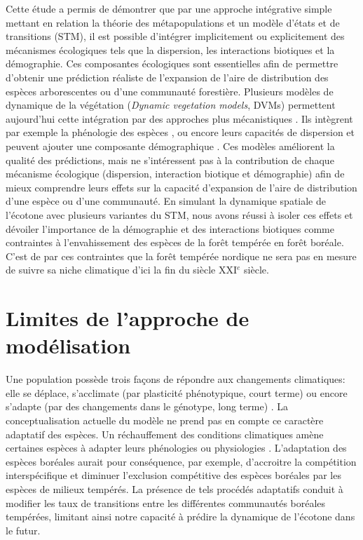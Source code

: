 
Cette étude a permis de démontrer que par une approche intégrative simple mettant en relation la
théorie des métapopulations et un modèle d'états et de transitions (STM), il est possible d'intégrer
implicitement ou explicitement des mécanismes écologiques tels que la dispersion, les interactions
biotiques et la démographie. Ces composantes écologiques sont essentielles afin de permettre
d'obtenir une prédiction réaliste de l'expansion de l'aire de distribution des espèces arborescentes
ou d'une communauté forestière. Plusieurs modèles de dynamique de la végétation (\textit{Dynamic
vegetation models}, DVMs) permettent aujourd'hui cette intégration par des approches plus
mécanistiques \citep{Snell2014a}. Ils intègrent par exemple la phénologie des espèces
\citep{Letters2001,Morin2008}, ou encore leurs capacités de dispersion \citep{Nobis2014,Iverson2004}
et peuvent ajouter une composante démographique \citep{Lischke2006a,Vanderwel2014}. Ces modèles
améliorent la qualité des prédictions, mais ne s'intéressent pas à la contribution de chaque
mécanisme écologique (dispersion, interaction biotique et démographie) afin de mieux comprendre
leurs effets sur la capacité d'expansion de l'aire de distribution d'une espèce ou d'une
communauté. En simulant la dynamique spatiale de l'écotone avec plusieurs variantes du STM, nous
avons réussi à isoler ces effets et dévoiler l'importance de la démographie et des interactions
biotiques comme contraintes à l'envahissement des espèces de la forêt tempérée en forêt boréale.
C'est de par ces contraintes que la forêt tempérée nordique ne sera pas en mesure de suivre sa
niche climatique d'ici la fin du siècle XXI$^e$ siècle.

\section*{Limites de l'approche de modélisation}

Une population possède trois façons de répondre aux  changements climatiques: elle se déplace,
s'acclimate (par plasticité phénotypique, court terme) ou encore s'adapte (par des changements dans
le génotype, long terme) \citep{Corlett2013}. La conceptualisation actuelle du modèle ne prend pas
en compte ce caractère adaptatif des espèces. Un réchauffement des conditions climatiques amène
certaines espèces à adapter leurs phénologies ou physiologies \citep{Saxe2001,Davis2001}.
L'adaptation des espèces boréales aurait pour conséquence, par exemple, d'accroitre la compétition
interspécifique et diminuer l'exclusion compétitive des espèces boréales par les espèces de milieux
tempérés. La présence de tels procédés adaptatifs conduit à modifier les taux de transitions entre
les différentes communautés boréales tempérées, limitant ainsi notre capacité à prédire la dynamique
de l'écotone dans le futur.

